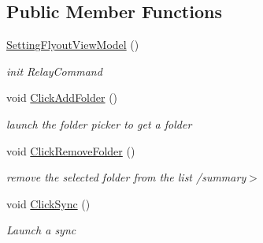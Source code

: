 \subsection*{Public Member Functions}
\begin{DoxyCompactItemize}
\item 
\hyperlink{class_presentation_1_1_view_model_1_1_setting_flyout_view_model_a7d2643acc0a988f6b6d5435a2e30b545}{Setting\+Flyout\+View\+Model} ()
\begin{DoxyCompactList}\small\item\em init Relay\+Command \end{DoxyCompactList}\item 
void \hyperlink{class_presentation_1_1_view_model_1_1_setting_flyout_view_model_a380acb37c0bc2c581fda502115e5bc50}{Click\+Add\+Folder} ()
\begin{DoxyCompactList}\small\item\em launch the folder picker to get a folder \end{DoxyCompactList}\item 
\mbox{\label{class_presentation_1_1_view_model_1_1_setting_flyout_view_model_adef39f08b4c7a39ffdda5a9d8517032a}} 
void \hyperlink{class_presentation_1_1_view_model_1_1_setting_flyout_view_model_adef39f08b4c7a39ffdda5a9d8517032a}{Click\+Remove\+Folder} ()
\begin{DoxyCompactList}\small\item\em remove the selected folder from the list /summary$>$ \end{DoxyCompactList}\item 
void \hyperlink{class_presentation_1_1_view_model_1_1_setting_flyout_view_model_aa4f9ea5fec87225339cfe33d1b8f064d}{Click\+Sync} ()
\begin{DoxyCompactList}\small\item\em Launch a sync \end{DoxyCompactList}\end{DoxyCompactItemize}
